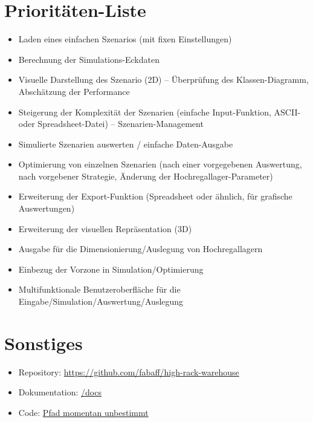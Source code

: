 \documentclass[11pt,a4paper]{article}
\begin{document}
\section{Prioritäten-Liste}
\begin{itemize}
  \item Laden eines einfachen Szenarios (mit fixen Einstellungen)
  \item Berechnung der Simulations-Eckdaten
  \item Visuelle Darstellung des Szenario (2D) -- Überprüfung des Klassen-Diagramm, Abschätzung der Performance
  \item Steigerung der Komplexität der Szenarien (einfache Input-Funktion, ASCII- oder Spreadsheet-Datei) -- Szenarien-Management
  \item Simulierte Szenarien auswerten / einfache Daten-Ausgabe
  \item Optimierung von einzelnen Szenarien (nach einer vorgegebenen Auswertung, nach vorgebener Strategie, Änderung der Hochregallager-Parameter)
  \item Erweiterung der Export-Funktion (Spreadsheet oder ähnlich, für grafische Auswertungen)
  \item Erweiterung der visuellen Repräsentation (3D)
  \item Ausgabe für die Dimensionierung/Auslegung von Hochregallagern
  \item Einbezug der Vorzone in Simulation/Optimierung
  \item Multifunktionale Benutzeroberfläche für die Eingabe/Simulation/Auswertung/Auslegung
\end{itemize}
%
\section{Sonstiges}
\begin{itemize}
  \item Repository: \href{https://github.com/fabaff/high-rack-warehouse}{https://github.com/fabaff/high-rack-warehouse}
  \item Dokumentation: \href{https://github.com/fabaff/high-rack-warehouse/tree/master/docs}{/docs}
  \item Code: \href{https://github.com/fabaff/high-rack-warehouse/}{Pfad momentan unbestimmt}
\end{itemize}
\end{document}
